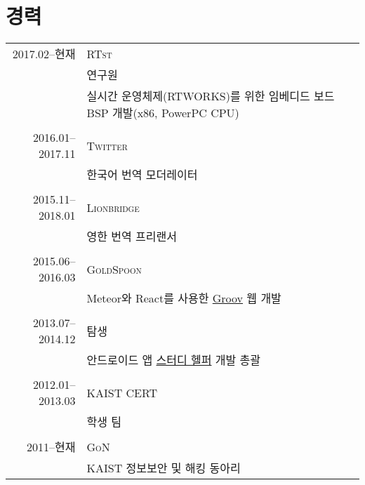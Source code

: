 \documentclass[a4paper,10pt]{article}
\begin{document}
\section{경력}
\begin{tabular}{r|p{11cm}}
  \textsc{2017.02--현재} & \textsc{RTst} \\
                         & 연구원 \\
                         & 실시간 운영체제(RTWORKS)를 위한 임베디드 보드 BSP 개발(x86, PowerPC CPU) \\
  \multicolumn{2}{c}{} \\

  \textsc{2016.01--2017.11} & \textsc{Twitter} \\
                         & 한국어 번역 모더레이터 \\
  \multicolumn{2}{c}{} \\

  \textsc{2015.11--2018.01} & \textsc{Lionbridge} \\
                         & 영한 번역 프리랜서 \\
  \multicolumn{2}{c}{} \\

  \textsc{2015.06--2016.03} & \textsc{GoldSpoon} \\
                            & Meteor와 React를 사용한 \href{http://groov.fm}{Groov} 웹 개발 \\
  \multicolumn{2}{c}{} \\

  \textsc{2013.07--2014.12} & \textsc{탐생} \\
                            & 안드로이드 앱 \href{https://play.google.com/store/apps/details?id=kr.co.tamseng.StudyHelper}{스터디 헬퍼} 개발 총괄 \\
  \multicolumn{2}{c}{} \\

  \textsc{2012.01--2013.03} & \textsc{KAIST CERT} \\
                            & 학생 팀 \\
  \multicolumn{2}{c}{} \\

  \textsc{2011--현재} & \textsc{GoN} \\
                      & KAIST 정보보안 및 해킹 동아리 \\
\end{tabular}
\end{document}
